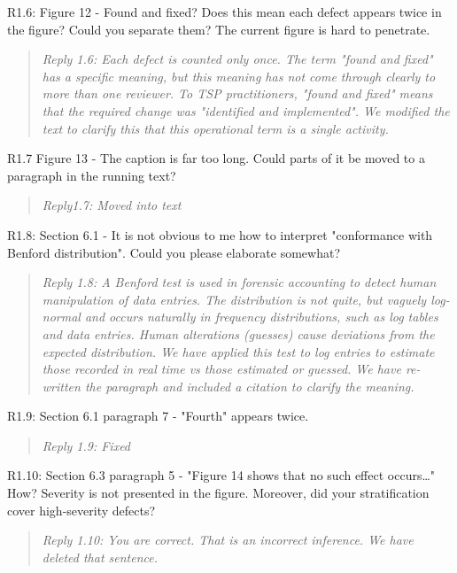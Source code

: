 \documentclass[smallcondensed]{svjour3}
\begin{document}
R1.6: Figure 12 - Found and fixed? Does this mean each defect appears twice in the figure? Could you separate them? The current figure is hard to penetrate.

\begin{quote}{\em 
Reply 1.6: Each defect is counted only once. The term "found and fixed" has a specific meaning, but this meaning has not come through clearly to more than one reviewer. To TSP practitioners, "found and fixed" means that the required change was "identified and implemented". We modified the text to clarify this that this operational term is a single activity.
}\end{quote}

R1.7 Figure 13 - The caption is far too long. Could parts of it be moved to a paragraph in the running text?

\begin{quote}{\em 
Reply1.7: Moved into text
}\end{quote}

R1.8: Section 6.1 - It is not obvious to me how to interpret "conformance with Benford distribution". Could you please elaborate somewhat?

\begin{quote}{\em 
Reply 1.8: A Benford test is used in forensic accounting to detect human manipulation of data entries. The distribution is not quite, but vaguely log-normal and occurs naturally in frequency distributions, such as log tables and data entries. Human alterations (guesses) cause deviations from the expected distribution. We have applied this test to log entries to estimate those recorded in real time vs those estimated or guessed. We have re-written the paragraph and included a citation to clarify the meaning.
}\end{quote}

R1.9: Section 6.1 paragraph 7 - "Fourth" appears twice.

\begin{quote}{\em 
Reply 1.9: Fixed
}\end{quote}

R1.10: Section 6.3 paragraph 5 - "Figure 14 shows that no such effect occurs…" How? Severity is not presented in the figure. Moreover, did your stratification cover high-severity defects?

\begin{quote}{\em 
Reply 1.10: You are correct. That is an incorrect inference. We have deleted that sentence.
}\end{quote}
\end{document}
